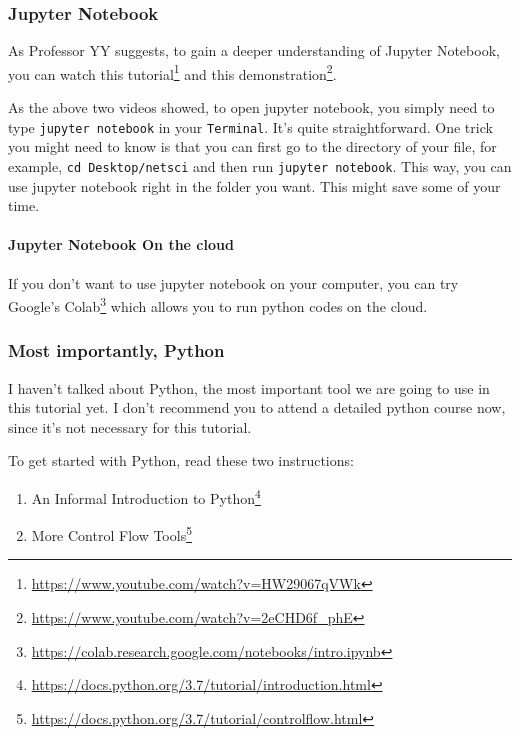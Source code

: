 \documentclass[
]{krantz}
\providecommand{\tightlist}{%
  \setlength{\itemsep}{0pt}\setlength{\parskip}{0pt}}
\renewcommand{\href}[2]{#2\footnote{\url{#1}}}
\begin{document}
\hypertarget{jupyter-notebook}{%
\subsubsection{Jupyter Notebook}\label{jupyter-notebook}}

As Professor YY suggests, to gain a deeper understanding of Jupyter Notebook, you can watch \href{https://www.youtube.com/watch?v=HW29067qVWk}{this tutorial} and \href{https://www.youtube.com/watch?v=2eCHD6f_phE}{this demonstration}.

As the above two videos showed, to open jupyter notebook, you simply need to type \texttt{jupyter\ notebook} in your \texttt{Terminal}. It's quite straightforward. One trick you might need to know is that you can first go to the directory of your file, for example, \texttt{cd\ Desktop/netsci} and then run \texttt{jupyter\ notebook}. This way, you can use jupyter notebook right in the folder you want. This might save some of your time.

\hypertarget{jupyter-notebook-on-the-cloud}{%
\paragraph{Jupyter Notebook On the cloud}\label{jupyter-notebook-on-the-cloud}}

If you don't want to use jupyter notebook on your computer, you can try \href{https://colab.research.google.com/notebooks/intro.ipynb}{Google's Colab} which allows you to run python codes on the cloud.

\hypertarget{most-importantly-python}{%
\subsubsection{Most importantly, Python}\label{most-importantly-python}}

I haven't talked about Python, the most important tool we are going to use in this tutorial yet. I don't recommend you to attend a detailed python course now, since it's not necessary for this tutorial.

To get started with Python, read these two instructions:

\begin{enumerate}
\def\labelenumi{\arabic{enumi}.}
\tightlist
\item
  \href{https://docs.python.org/3.7/tutorial/introduction.html}{An Informal Introduction to Python}
\item
  \href{https://docs.python.org/3.7/tutorial/controlflow.html}{More Control Flow Tools}
\end{enumerate}
\end{document}
